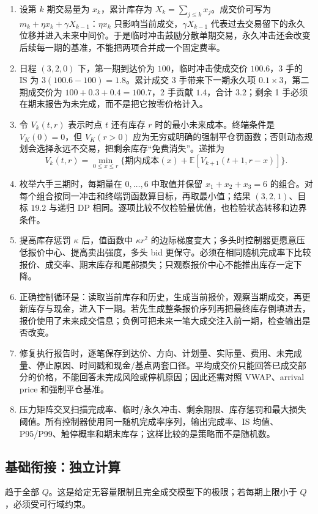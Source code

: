 
\begin{enumerate}[leftmargin=*]
  \item 设第 $k$ 期交易量为 $x_k$，累计库存为 $X_k=\sum_{j\le k}x_j$。成交价可写为 $m_k+\eta x_k+\gamma X_{k-1}$：$\eta x_k$ 只影响当前成交，$\gamma X_{k-1}$ 代表过去交易留下的永久位移并进入未来中间价。于是临时冲击鼓励分散单期交易，永久冲击还会改变后续每一期的基准，不能把两项合并成一个固定费率。
  \item 日程 $(3,2,0)$ 下，第一期到达价为 $100$，临时冲击使成交价 $100.6$，3 手的 IS 为 $3(100.6-100)=1.8$。累计成交 3 手带来下一期永久项 $0.1\times3$，第二期成交价为 $100+0.3+0.4=100.7$，2 手贡献 $1.4$，合计 $3.2$；剩余 1 手必须在期末报告为未完成，而不是把它按零价格计入。
  \item 令 $V_k(t,r)$ 表示时点 $t$ 还有库存 $r$ 时的最小未来成本。终端条件是 $V_K(0)=0$，但 $V_K(r>0)$ 应为无穷或明确的强制平仓罚函数；否则动态规划会选择永远不交易，把剩余库存“免费消失”。递推为
  \[
  V_k(t,r)=\min_{0\le x\le r}\{\text{期内成本}(x)+\mathbb E[V_{k+1}(t+1,r-x)]\}.
  \]
  \item 枚举六手三期时，每期量在 $0,\ldots,6$ 中取值并保留 $x_1+x_2+x_3=6$ 的组合。对每个组合按同一冲击和终端罚函数算目标，再取最小值；结果 $(3,2,1)$、目标 $19.2$ 与递归 DP 相同。逐项比较不仅检验最优值，也检验状态转移和边界条件。
  \item 提高库存惩罚 $\kappa$ 后，值函数中 $\kappa r^2$ 的边际梯度变大；多头时控制器更愿意压低报价中心、提高卖出强度，多头 bid 更保守。必须在相同随机完成率下比较报价、成交率、期末库存和尾部损失；只观察报价中心不能推出库存一定下降。
  \item 正确控制循环是：读取当前库存和历史，生成当前报价，观察当期成交，再更新库存与现金，进入下一期。若先生成整条报价序列再把最终库存倒填进去，报价使用了未来成交信息；负例可把未来一笔大成交注入前一期，检查输出是否改变。
  \item 修复执行报告时，逐笔保存到达价、方向、计划量、实际量、费用、未完成量、停止原因、时间戳和现金/基点两套口径。平均成交价只能回答已成交部分的价格，不能回答未完成风险或停机原因；因此还需对照 VWAP、arrival price 和强制平仓基准。
  \item 压力矩阵交叉扫描完成率、临时/永久冲击、剩余期限、库存惩罚和最大损失阈值。所有控制器使用同一随机完成率序列，输出完成率、IS 均值、P95/P99、触停概率和期末库存；这样比较的是策略而不是随机数。
\end{enumerate}

\subsection*{基础衔接：独立计算}
趋于全部 $Q$。这是给定无容量限制且完全成交模型下的极限；若每期上限小于 $Q$，必须受可行域约束。
